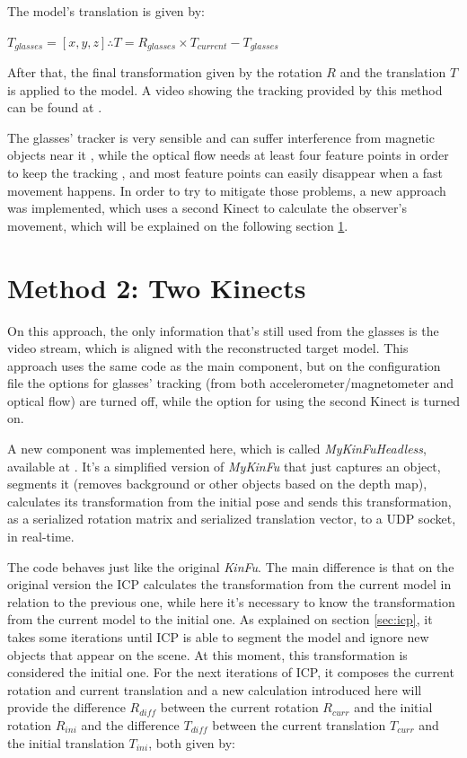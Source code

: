 \documentclass[msc, a4paper, classic, en]{ufbathesis}
\begin{document}
The model's translation is given by:

\begin{center}
$T_{glasses} = [x, y, z] \therefore T = R_{glasses} \times T_{current} - T_{glasses}$
\end{center}

After that, the final transformation given by the rotation $R$ and the translation $T$ is applied to the model. A video showing the tracking provided by this method can be found at \cite{videos}. 

The glasses' tracker is very sensible and can suffer interference from magnetic objects near it \cite{vuzixsdk}, while the optical flow needs at least four feature points in order to keep the tracking \cite{opencvfd}, and most feature points can easily disappear when a fast movement happens. In order to try to mitigate those problems, a new approach was implemented, which uses a second Kinect to calculate the observer's movement, which will be explained on the following section \ref{sec:method2}.

\section{Method 2: Two Kinects}
\label{sec:method2}

On this approach, the only information that's still used from the glasses is the video stream, which is aligned with the reconstructed target model. This approach uses the same code as the main component, but on the configuration file the options for glasses' tracking (from both accelerometer/magnetometer and optical flow) are turned off, while the option for using the second Kinect is turned on.

A new component was implemented here, which is called \textit{MyKinFuHeadless}, available at \cite{mykinfuheadless}. It's a simplified version of \textit{MyKinFu} that just captures an object, segments it (removes background or other objects based on the depth map), calculates its transformation from the initial pose and sends this transformation, as a serialized rotation matrix and serialized translation vector, to a UDP socket, in real-time.

The code behaves just like the original \textit{KinFu}. The main difference is that on the original version the ICP calculates the transformation from the current model in relation to the previous one, while here it's necessary to know the transformation from the current model to the initial one. As explained on section \ref{sec:icp}, it takes some iterations until ICP is able to segment the model and ignore new objects that appear on the scene. At this moment, this transformation is considered the initial one. For the next iterations of ICP, it composes the current rotation and current translation and a new calculation introduced here will provide the difference $R_{diff}$ between the current rotation $R_{curr}$ and the initial rotation $R_{ini}$ and the difference $T_{diff}$ between the current translation $T_{curr}$ and the initial translation $T_{ini}$, both given by:
\end{document}
